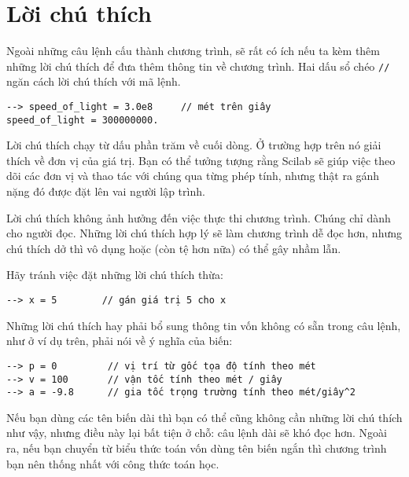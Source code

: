 \documentclass[12pt]{book}
\begin{document}
%
%



\section{Lời chú thích}

Ngoài những câu lệnh cấu thành chương trình, sẽ rất có ích nếu ta kèm
thêm những lời chú thích để đưa thêm thông tin về chương trình. Hai dấu 
sổ chéo {\tt //} ngăn cách lời chú thích với mã lệnh.

\begin{verbatim}
--> speed_of_light = 3.0e8     // mét trên giây
speed_of_light = 300000000.
\end{verbatim}
%
Lời chú thích chạy từ dấu phần trăm về cuối dòng. Ở trường hợp trên
nó giải thích về đơn vị của giá trị. Bạn có thể tưởng tượng rằng Scilab
sẽ giúp việc theo dõi các đơn vị và thao tác với chúng qua từng phép tính,
nhưng thật ra gánh nặng đó được đặt lên vai người lập trình.

Lời chú thích không ảnh hưởng đến việc thực thi chương trình. Chúng
chỉ dành cho người đọc. Những lời chú thích hợp lý sẽ làm chương trình
dễ đọc hơn, nhưng chú thích dở thì vô dụng hoặc (còn tệ hơn nữa)
có thể gây nhầm lẫn.

Hãy tránh việc đặt những lời chú thích thừa:

\begin{verbatim}
--> x = 5        // gán giá trị 5 cho x
\end{verbatim}
%
Những lời chú thích hay phải bổ sung thông tin vốn không có sẵn trong
câu lệnh, như ở ví dụ trên, phải nói về ý nghĩa của biến:

\begin{verbatim}
--> p = 0         // vị trí từ gốc tọa độ tính theo mét
--> v = 100       // vận tốc tính theo mét / giây
--> a = -9.8      // gia tốc trọng trường tính theo mét/giây^2
\end{verbatim}
%
Nếu bạn dùng các tên biến dài thì bạn có thể cũng không cần những
lời chú thích như vậy, nhưng điều này lại bất tiện ở chỗ: câu lệnh dài
sẽ khó đọc hơn. Ngoài ra, nếu bạn chuyển từ biểu thức toán vốn 
dùng tên biến ngắn thì chương trình bạn nên thống nhất với công
thức toán học.
\end{document}
